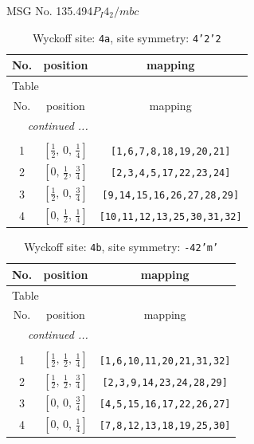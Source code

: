 \documentclass[fleqn,8pt]{jsarticle}
\begin{document}
\setcounter{MaxMatrixCols}{32}

\renewcommand{\tablename}{Table~}
\renewcommand{\figurename}{Figure~}
\begin{center}
\LARGE
MSG No. 135.494\quad$P_{I}4_{2}/mbc$
\end{center}
\renewcommand{\arraystretch}{1.2}
\begin{longtable}{ccc}
\caption{Wyckoff site: {\tt 4a}, site symmetry: {\tt 4'2'2}}
 \\
 \hline \hline
No. & position & mapping \\ \hline \endfirsthead

\multicolumn{2}{l}{\tablename\ \thetable{}} \\
 \hline \hline
No. & position & mapping \\ \hline \endhead

 \hline \hline
\multicolumn{2}{r}{\footnotesize\it continued ...} \\ \endfoot

 \hline \hline
\multicolumn{2}{r}{} \\ \endlastfoot

1 & $\left[ \frac{1}{2},\, 0,\, \frac{1}{4} \right]$ & {\tt [1,6,7,8,18,19,20,21]} \\ \hline
2 & $\left[ 0,\, \frac{1}{2},\, \frac{3}{4} \right]$ & {\tt [2,3,4,5,17,22,23,24]} \\ \hline
3 & $\left[ \frac{1}{2},\, 0,\, \frac{3}{4} \right]$ & {\tt [9,14,15,16,26,27,28,29]} \\ \hline
4 & $\left[ 0,\, \frac{1}{2},\, \frac{1}{4} \right]$ & {\tt [10,11,12,13,25,30,31,32]} \\
\end{longtable}
\renewcommand{\arraystretch}{1.2}
\begin{longtable}{ccc}
\caption{Wyckoff site: {\tt 4b}, site symmetry: {\tt -42'm'}}
 \\
 \hline \hline
No. & position & mapping \\ \hline \endfirsthead

\multicolumn{2}{l}{\tablename\ \thetable{}} \\
 \hline \hline
No. & position & mapping \\ \hline \endhead

 \hline \hline
\multicolumn{2}{r}{\footnotesize\it continued ...} \\ \endfoot

 \hline \hline
\multicolumn{2}{r}{} \\ \endlastfoot

1 & $\left[ \frac{1}{2},\, \frac{1}{2},\, \frac{1}{4} \right]$ & {\tt [1,6,10,11,20,21,31,32]} \\ \hline
2 & $\left[ \frac{1}{2},\, \frac{1}{2},\, \frac{3}{4} \right]$ & {\tt [2,3,9,14,23,24,28,29]} \\ \hline
3 & $\left[ 0,\, 0,\, \frac{3}{4} \right]$ & {\tt [4,5,15,16,17,22,26,27]} \\ \hline
4 & $\left[ 0,\, 0,\, \frac{1}{4} \right]$ & {\tt [7,8,12,13,18,19,25,30]} \\
\end{longtable}
\end{document}
